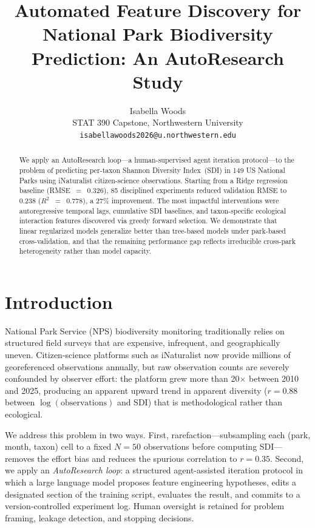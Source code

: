 \documentclass{article}
\title{Automated Feature Discovery for National Park Biodiversity\\
       Prediction: An AutoResearch Study}
\author{%
  Isabella Woods \\
  STAT 390 Capstone, Northwestern University \\
  \texttt{isabellawoods2026@u.northwestern.edu}
}
\begin{document}
\maketitle

\begin{abstract}
We apply an AutoResearch loop---a human-supervised agent iteration
protocol---to the problem of predicting per-taxon Shannon Diversity
Index~(SDI) in 149 US National Parks using iNaturalist citizen-science
observations. Starting from a Ridge regression baseline
(RMSE~$=$~0.326), 85 disciplined experiments reduced validation RMSE
to 0.238 ($R^{2}$~$=$~0.778), a 27\% improvement. The most impactful
interventions were autoregressive temporal lags, cumulative SDI
baselines, and taxon-specific ecological interaction features
discovered via greedy forward selection. We demonstrate that linear
regularized models generalize better than tree-based models under
park-based cross-validation, and that the remaining performance gap
reflects irreducible cross-park heterogeneity rather than model
capacity.
\end{abstract}

\section{Introduction}
\label{sec:intro}

National Park Service (NPS) biodiversity monitoring traditionally
relies on structured field surveys that are expensive, infrequent, and
geographically uneven. Citizen-science platforms such as iNaturalist
now provide millions of georeferenced observations annually, but raw
observation counts are severely confounded by observer effort: the
platform grew more than 20$\times$ between 2010 and 2025, producing an
apparent upward trend in apparent diversity ($r = 0.88$ between
$\log(\text{observations})$ and SDI) that is methodological rather than
ecological.

We address this problem in two ways. First, rarefaction---subsampling
each (park, month, taxon) cell to a fixed $N = 50$ observations before
computing SDI---removes the effort bias and reduces the spurious
correlation to $r = 0.35$. Second, we apply an \emph{AutoResearch
loop}: a structured agent-assisted iteration protocol in which a large
language model proposes feature engineering hypotheses, edits a
designated section of the training script, evaluates the result, and
commits to a version-controlled experiment log. Human oversight is
retained for problem framing, leakage detection, and stopping
decisions.
\end{document}
